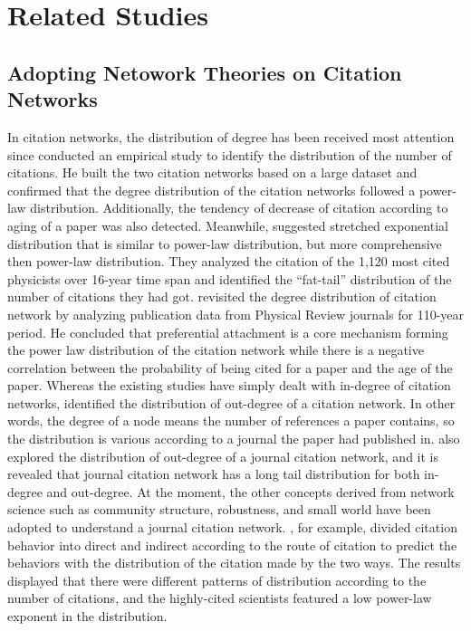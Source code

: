\documentclass{article}
\begin{document}
\section{Related Studies}
\subsection{Adopting Netowork Theories on Citation Networks}
In citation networks, the distribution of degree has been received most attention since \cite{redner1998popular} conducted an empirical study to identify the distribution of the number of citations. He built the two citation networks based on a large dataset and confirmed that the degree distribution of the citation networks followed a power-law distribution. Additionally, the tendency of decrease of citation according to aging of a paper was also detected. Meanwhile, \cite{laherrere1998stretched} suggested stretched exponential distribution that is similar to power-law distribution, but more comprehensive then power-law distribution. They analyzed the citation of the 1,120 most cited physicists over 16-year time span and identified the “fat-tail” distribution of the number of citations they had got. \cite{redner2004citation} revisited the degree distribution of citation network by analyzing publication data from Physical Review journals for 110-year period. He concluded that preferential attachment is a core mechanism forming the power law distribution of the citation network while there is a negative correlation between the probability of being cited for a paper and the age of the paper. Whereas the existing studies have simply dealt with in-degree of citation networks, \cite{vazquez2001statistics} identified the distribution of out-degree of a citation network. In other words, the degree of a node means the number of references a paper contains, so the distribution is various according to a journal the paper had published in. \cite{franceschet2012large} also explored the distribution of out-degree of a journal citation network, and it is revealed that journal citation network has a long tail distribution for both in-degree and out-degree. At the moment, the other concepts derived from network science such as community structure, robustness, and small world have been adopted to understand a journal citation network. \cite{peterson2010nonuniversal}, for example, divided citation behavior into direct and indirect according to the route of citation to predict the behaviors with the distribution of the citation made by the two ways. The results displayed that there were different patterns of distribution according to the number of citations, and the highly-cited scientists featured a low power-law exponent in the distribution. 
\end{document}

